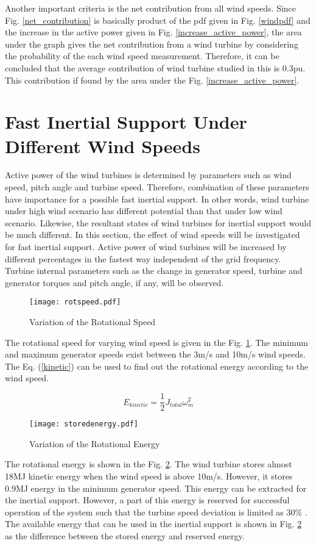 Another important criteria is the net contribution from all wind speeds. Since Fig. \ref{net_contribution} is basically product of the pdf given in Fig. \ref{windpdf} and the increase in the active power given in Fig. \ref{increase_active_power}, the area under the graph gives the net contribution from a wind turbine by considering the probability of the each wind speed measurement. Therefore, it can be concluded that the average contribution of wind turbine studied in this is 0.3pu. This contribution if found by the area under the Fig. \ref{increase_active_power}.
\section{Fast Inertial Support Under Different Wind Speeds}
Active power of the wind turbines is determined by parameters such as wind speed, pitch angle and turbine speed. Therefore, combination of these parameters have importance for a possible fast inertial support. In other words, wind turbine under high wind scenario has different potential than that under low wind scenario. Likewise, the resultant states of wind turbines for inertial support would be much different. In this section, the effect of wind speeds will be investigated for fast inertial support. Active power of wind turbines will be increased by different percentages in the fastest way independent of the grid frequency. Turbine internal parameters such as the change in generator speed, turbine and generator torques and pitch angle, if any, will be observed. \par
\begin{figure}[h]
	\centering
	\texttt{[image: rotspeed.pdf]}
	\caption{Variation of the Rotational Speed}
	\label{rotspeed}
\end{figure}
The rotational speed for varying wind speed is given in the Fig. \ref{rotspeed}. The minimum and maximum generator speeds exist between the 3m/s and 10m/s wind speeds. The Eq. (\ref{kinetic}) can be used to find out the rotational energy according to the wind speed. \par
\begin{equation}
E_{kinetic}=\frac{1}{2}J_{total}\omega_{m}^{2}
\label{kinetic}
\end{equation}
\begin{figure}[h!]
	\centering
	\texttt{[image: storedenergy.pdf]}
	\caption{Variation of the Rotational Energy}
	\label{rotenergy}
\end{figure}
The rotational energy is shown in the Fig. \ref{rotenergy}. The wind turbine stores almost 18MJ kinetic energy when the wind speed is above 10m/s. However, it stores 0.9MJ energy in the minimum generator speed. This energy can be extracted for the inertial support. However, a part of this energy is reserved for successful operation of the system such that the turbine speed deviation is limited as 30\% \cite{Wu2014}. The available energy that can be used in the inertial support is shown in Fig. \ref{rotenergy} as the difference between the stored energy and reserved energy. \par
